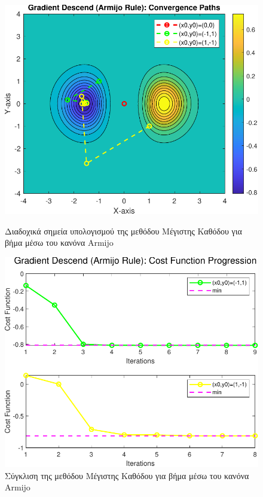 \documentclass[a4paper,12pt]{article}
\begin{document}
\begin{figure}[h]
    \centering
    \begin{minipage}{0.47\textwidth}
        \centering
        \includegraphics[width=1\linewidth]{plot/gradient_descend_armijo_rule_contour.pdf}
        \caption{\small Διαδοχικά σημεία υπολογισμού της μεθόδου Μέγιστης Καθόδου για βήμα μέσω του κανόνα  Armijo }
        \label{fig:gradient_descend_armijo_rule_contour}
    \end{minipage} \hfill
    \begin{minipage}{0.47\textwidth}
        \centering
        \includegraphics[width=1\linewidth]{plot/gradient_descend_armijo_rule_costs.pdf}
        \caption{\small Σύγκλιση της μεθόδου Μέγιστης Καθόδου για βήμα μέσω του κανόνα  Armijo }
        \label{fig:gradient_descend_armijo_rule_costs}
    \end{minipage}
\end{figure}
\end{document}
